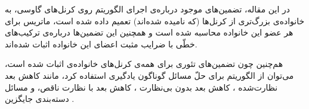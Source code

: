 در این مقاله، تضمین‌های موجود درباره‌ی اجرای الگوریتم 
روی کرنل‌های گاوسی، به خانواده‌ی بزرگ‌تری از کرنل‌ها (که 
نامیده شده‌اند)
تعمیم داده شده است، ماتریس
\lr{$\Phi$}
برای هر عضو این خانواده محاسبه شده است و همچنین این تضمین‌ها درباره‌ی ترکیب‌های خطّی با ضرایب مثبت اعضای این خانواده اثبات شده‌اند. 

هم‌چنین چون تضمین‌های تئوری
برای همه‌ی کرنل‌های خانواده‌ی
اثبات شده است، می‌توان از الگوریتم
برای حلّ مسائل گوناگون یادگیری استفاده کرد، مانند کاهش بعد نظارت‌شده
\cite{fukumizu2009kernel,barshan2011supervised,masaeli2010transformation}،
کاهش بعد بدون بی‌نظارت
\cite{scholkopf1998nonlinear,niu2011dimensionality}،
کاهش بعد با نظارت ناقص،
\cite{gangeh2016semi,chang2017clustering}
و مسائل دسته‌بندی جایگزین
\cite{wu2018iterative,niu2010multiple,niu2014iterative}.

